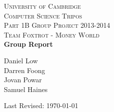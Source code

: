 \begin{titlepage}
\begin{center}

\textsc{\LARGE University of Cambridge}\\[3.5cm]

\textsc{\Large Computer Science Tripos \\[2mm] Part 1B Group Project 2013-2014}\\[0.4cm]
\textsc{\Large Team Foxtrot - Money World}\\[2cm]

{\huge \bfseries \vspace{3.5mm} Group Report}\\[2cm]

\begin{center}
\large
Daniel Low\\
Darren Foong\\
Jovan Powar\\
Samuel Haines\\
\end{center}

\vfill

{\large Last Revised: \today}
\end{center}
\end{titlepage}
